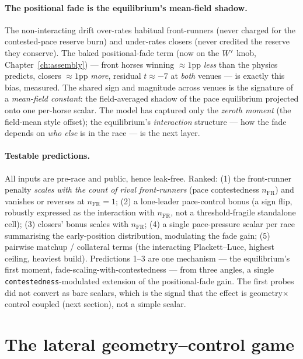 \paragraph{The positional fade is the equilibrium's mean-field shadow.} The non-interacting drift
over-rates habitual front-runners (never charged for the contested-pace reserve burn) and
under-rates closers (never credited the reserve they conserve). The baked positional-fade term
(now on the ${W^{\prime}}$ knob, Chapter~\ref{ch:assembly}) --- front horses winning $\approx 1$pp \emph{less}
than the physics predicts, closers $\approx 1$pp \emph{more}, residual $t\approx -7$ at \emph{both}
venues --- is exactly this bias, measured. The shared sign and magnitude across venues is the
signature of a \emph{mean-field constant}: the field-averaged shadow of the pace equilibrium
projected onto one per-horse scalar. The model has captured only the \emph{zeroth moment} (the
field-mean style offset); the equilibrium's \emph{interaction} structure --- how the fade depends on
\emph{who else} is in the race --- is the next layer.

\paragraph{Testable predictions.} All inputs are pre-race and public, hence leak-free. Ranked:
(1) the front-runner penalty \emph{scales with the count of rival front-runners} (pace
contestedness $n_{\text{FR}}$) and vanishes or reverses at $n_{\text{FR}}=1$; (2) a lone-leader
pace-control bonus (a sign flip, robustly expressed as the interaction with $n_{\text{FR}}$, not a
threshold-fragile standalone cell); (3) closers' bonus scales with $n_{\text{FR}}$; (4) a single
pace-pressure scalar per race summarising the early-position distribution, modulating the fade
gain; (5) pairwise matchup / collateral terms (the interacting Plackett--Luce, highest ceiling,
heaviest build). Predictions 1--3 are one mechanism --- the equilibrium's first moment,
fade-scaling-with-contestedness --- from three angles, a single \texttt{contestedness}-modulated
extension of the positional-fade gain. The first probes did not convert as bare scalars, which is
the signal that the effect is geometry$\times$control coupled (next section), not a simple scalar.

\section{The lateral geometry--control game}
\label{sec:geomgame}

